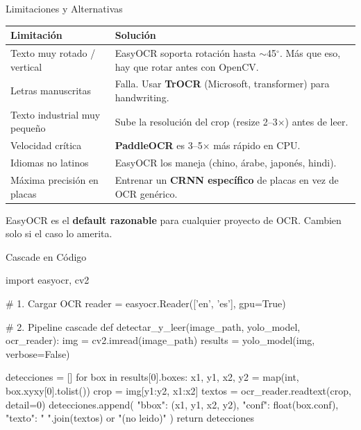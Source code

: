 \documentclass[aspectratio=169, 11pt]{beamer}
\begin{document}
\begin{frame}[shrink]{Limitaciones y Alternativas}
  \vspace{6pt}
  {\footnotesize
  \begin{tabular}{@{}p{3.5cm} p{8.7cm}@{}}
    \toprule
    \textbf{Limitaci\'on} & \textbf{Soluci\'on} \\
    \midrule
    \rowcolor{arcaGray}
    Texto muy rotado / vertical
    & EasyOCR soporta rotaci\'on hasta $\sim$45$^\circ$. M\'as que eso,
      hay que rotar antes con OpenCV. \\
    Letras manuscritas
    & Falla. Usar \textbf{TrOCR} (Microsoft, transformer) para handwriting. \\
    \rowcolor{arcaGray}
    Texto industrial muy peque\~no
    & Sube la resoluci\'on del crop (resize 2--3$\times$) antes de leer. \\
    Velocidad cr\'itica
    & \textbf{PaddleOCR} es 3--5$\times$ m\'as r\'apido en CPU. \\
    \rowcolor{arcaGray}
    Idiomas no latinos
    & EasyOCR los maneja (chino, \'arabe, japon\'es, hindi). \\
    M\'axima precisi\'on en placas
    & Entrenar un \textbf{CRNN espec\'ifico} de placas en vez de OCR
      gen\'erico. \\
    \bottomrule
  \end{tabular}
  }

  \vspace{8pt}
  {\scriptsize\color{textMuted}
    \faLightbulb\hspace{4pt} EasyOCR es el \textbf{default razonable} para
    cualquier proyecto de OCR. Cambien solo si el caso lo amerita.}
\end{frame}

\begin{frame}{Cascade en C\'odigo}
  \vspace{-4pt}
  \begin{pyblock}
import easyocr, cv2

# 1. Cargar OCR
reader = easyocr.Reader(['en', 'es'], gpu=True)

# 2. Pipeline cascade
def detectar_y_leer(image_path, yolo_model, ocr_reader):
    img = cv2.imread(image_path)
    results = yolo_model(img, verbose=False)

    detecciones = []
    for box in results[0].boxes:
        x1, y1, x2, y2 = map(int, box.xyxy[0].tolist())
        crop = img[y1:y2, x1:x2]
        textos = ocr_reader.readtext(crop, detail=0)
        detecciones.append({
            "bbox": (x1, y1, x2, y2),
            "conf": float(box.conf),
            "texto": " ".join(textos) or "(no leido)"
        })
    return detecciones
  \end{pyblock}
\end{frame}
\end{document}
